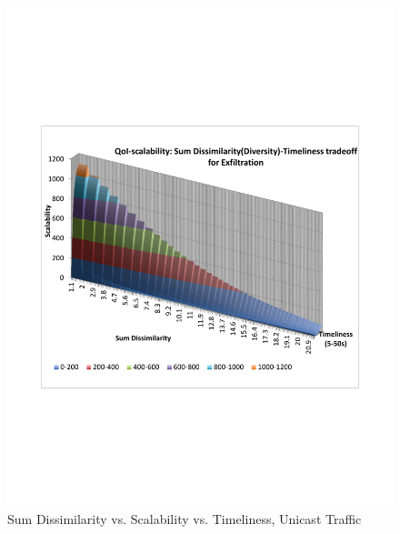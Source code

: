 \begin{figure}
    \includegraphics[scale=0.35]{figures/span_uni.pdf}
    \caption{Sum Dissimilarity vs. Scalability vs. Timeliness, Unicast Traffic}
    \label{fig:3dplot3}
\end{figure}


